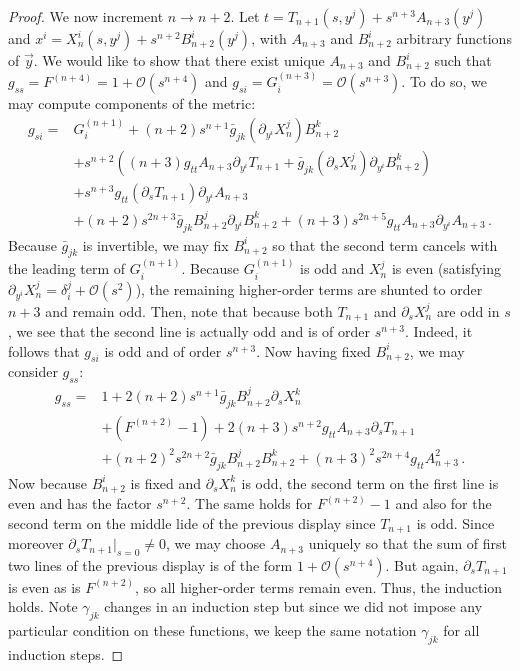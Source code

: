 \documentclass[a4paper,10.9pt]{amsart}
\theoremstyle{definition}
\theoremstyle{remark}
\numberwithin{equation}{section}
\renewcommand{\=}{\stackrel \Sigma =}
\begin{document}
\begin{proof}
We now increment $n \rightarrow n+2$. Let $t = T_{n+1}(s,y^j) + s^{n+3} A_{n+3}(y^j)$ and $x^i = X^i_{n}(s,y^j) + s^{n+2} B^i_{n+2}(y^j)$, with $A_{n+3}$ and $B^i_{n+2}$ arbitrary functions of $\vec{y}$. We would like to show that there exist unique $A_{n+3}$ and $B^i_{n+2}$ such that 
$g_{ss} = F^{(n+4)} = 1 + \mathcal{O}(s^{n+4})$ and $g_{si} = G^{(n+3)}_i = \mathcal{O}(s^{n+3})$. 
To do so, we may compute components of the metric:
\begin{align*}
g_{si} =& G^{(n+1)}_i +  (n+2)  s^{n+1} \bar{g}_{jk} (\partial_{y^i} X_n^j) B^k_{n+2} \\
&+ s^{n+2} \left((n+3) g_{tt} A_{n+3} \partial_{y^i} T_{n+1} + \bar{g}_{jk} (\partial_s X^j_n)\partial_{y^i} B^k_{n+2} \right) \\
&+ s^{n+3} g_{tt} (\partial_s T_{n+1}) \partial_{y^i} A_{n+3} \\
&+ (n+2) s^{2n+3} \bar{g}_{jk} B^j_{n+2} \partial_{y^i} B^k_{n+2} + (n+3) s^{2n+5} g_{tt} A_{n+3}  \partial_{y^i} A_{n+3} \,.
\end{align*}
Because $\bar{g}_{jk}$ is invertible, we may fix $B^i_{n+2}$ so that the second term cancels with the leading term of $G^{(n+1)}_i$. Because $G^{(n+1)}_i$ is odd and $X^j_n$ is even (satisfying $\partial_{y^i} X^j_n = \delta_i^j + \mathcal{O}(s^2)$), the remaining higher-order terms are shunted to order $n+3$ and remain odd. Then, note that because both $T_{n+1}$ and $\partial_s X^j_n$ are odd in $s$, we see that the second line is actually odd and is of order $s^{n+3}$. Indeed, it follows that $g_{si}$ is odd and of order $s^{n+3}$. Now having fixed $B^i_{n+2}$, we may consider $g_{ss}$:
\begin{align*}
g_{ss} =& 1 + 2(n+2) s^{n+1} \bar{g}_{jk} B^j_{n+2} \partial_s X^k_n \\
&+ (F^{(n+2)} - 1)  + 2(n+3) s^{n+2} g_{tt} A_{n+3} \partial_s T_{n+1} \\
&+ (n+2)^2 s^{2n+2} \bar{g}_{jk} B^j_{n+2} B^k_{n+2} + (n+3)^2 s^{2n+4} g_{tt} A_{n+3}^2 \,.
\end{align*}
Now because $B^i_{n+2}$ is fixed and $\partial_s X^k_n$ is odd, the second term on the first line is 
even and has the factor $s^{n+2}$. The same holds for $F^{(n+2)} - 1$ and also for the second
term on the middle lide of the previous display since $T_{n+1}$ is odd. Since moreover $\partial_s T_{n+1}|_{s = 0} \neq 0$, 
we may choose $A_{n+3}$ uniquely so that the sum of first two lines of the previous display is of the form
$1 + \mathcal{O}(s^{n+4})$. 
But again, $\partial_s T_{n+1}$ is even as is $F^{(n+2)}$, so all higher-order terms remain even. Thus, the induction holds. 
Note $\gamma_{jk}$ changes in an induction step but since we did not impose any particular condition
on these functions, we keep the same notation $\gamma_{jk}$ for all induction steps.



\end{proof}
\end{document}
